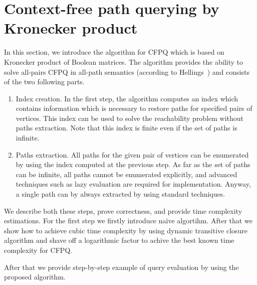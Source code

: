 \section{Context-free path querying by Kronecker product}


In this section, we introduce the algorithm for CFPQ which is based on Kronecker product of Boolean matrices. 
The algorithm provides the ability to solve all-pairs CFPQ in all-path semantics (according to Hellings~\cite{hellingsPathQuerying}) and consists of the two following parts. 
\begin{enumerate}
\item Index creation. In the first step, the algorithm computes an index which contains information which is necessary to restore paths for specified pairs of vertices. This index can be used to solve the reachability problem without paths extraction. Note that this index is finite even if the set of paths is infinite.
\item Paths extraction. All paths for the given pair of vertices can be enumerated by using the index computed at the previous step. As far as the set of paths can be infinite, all paths cannot be enumerated explicitly, and advanced techniques such as lazy evaluation are required for implementation. Anyway, a single path can by always extracted by using standard techniques.
\end{enumerate}

We describe both these steps, prove correctness, and provide time complexity estimations. 
For the first step we firstly introduce na{\"i}ve algortihm. After that we show how to achieve cubic time complexity by using dynamic transitive closure algorithm and shave off a logarithmic factor to achive the best known time complexity for CFPQ.

After that we provide step-by-step example of query evaluation by using the proposed algorithm.



